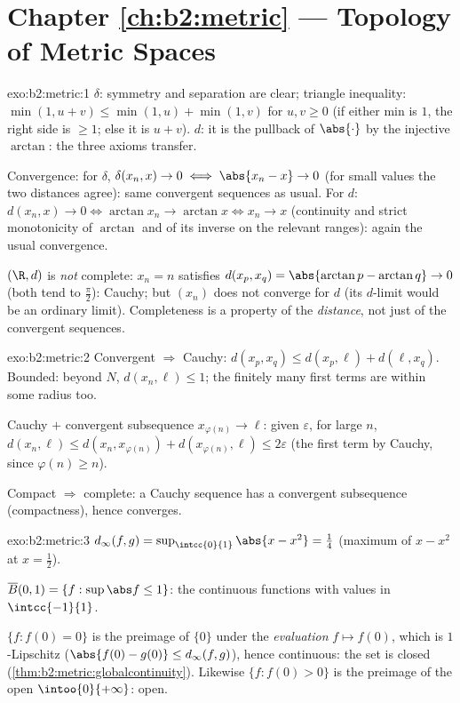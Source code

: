 \section*{Chapter \ref{ch:b2:metric} --- Topology of Metric Spaces}

\begin{solution}{exo:b2:metric:1}
$\delta$: symmetry and separation are clear; triangle inequality:
$\min(1, u + v) \leq \min(1,u) + \min(1,v)$ for $u, v \geq 0$ (if
either min is $1$, the right side is $\geq 1$; else it is $u + v$).
$d$: it is the pullback of $\abs{\cdot}$ by the injective $\arctan$:
the three axioms transfer.

Convergence: for $\delta$, $\delta(x_n, x) \to 0 \iff \abs{x_n - x}
\to 0$ (for small values the two distances agree): same convergent
sequences as usual. For $d$: $d(x_n, x) \to 0 \iff \arctan x_n \to
\arctan x \iff x_n \to x$ (continuity and strict monotonicity of
$\arctan$ and of its inverse on the relevant ranges): again the
usual convergence.

$(\R, d)$ is \emph{not} complete: $x_n = n$ satisfies $d(x_p, x_q)
= \abs{\arctan p - \arctan q} \to 0$ (both tend to $\frac\pi2$):
Cauchy; but $(x_n)$ does not converge for $d$ (its $d$-limit would
be an ordinary limit). Completeness is a property of the
\emph{distance}, not just of the convergent sequences.
\end{solution}

\begin{solution}{exo:b2:metric:2}
Convergent $\Rightarrow$ Cauchy: $d(x_p, x_q) \leq d(x_p, \ell) +
d(\ell, x_q)$. Bounded: beyond $N$, $d(x_n, \ell) \leq 1$; the
finitely many first terms are within some radius too.

Cauchy $+$ convergent subsequence $x_{\varphi(n)} \to \ell$: given
$\varepsilon$, for large $n$, $d(x_n, \ell) \leq d(x_n,
x_{\varphi(n)}) + d(x_{\varphi(n)}, \ell) \leq 2\varepsilon$ (the
first term by Cauchy, since $\varphi(n) \geq n$).

Compact $\Rightarrow$ complete: a Cauchy sequence has a convergent
subsequence (compactness), hence converges.
\end{solution}

\begin{solution}{exo:b2:metric:3}
$d_\infty(f, g) = \sup_{\intcc{0}{1}} \abs{x - x^2} = \frac14$
(maximum of $x - x^2$ at $x = \frac12$).

$\overline B(0, 1) = \{f : \sup\abs f \leq 1\}$: the continuous
functions with values in $\intcc{-1}{1}$.

$\{f : f(0) = 0\}$ is the preimage of $\{0\}$ under the
\emph{evaluation} $f \mapsto f(0)$, which is $1$-Lipschitz
($\abs{f(0) - g(0)} \leq d_\infty(f,g)$), hence continuous: the set
is closed (\cref{thm:b2:metric:globalcontinuity}). Likewise $\{f :
f(0) > 0\}$ is the preimage of the open $\intoo{0}{+\infty}$: open.
\end{solution}

